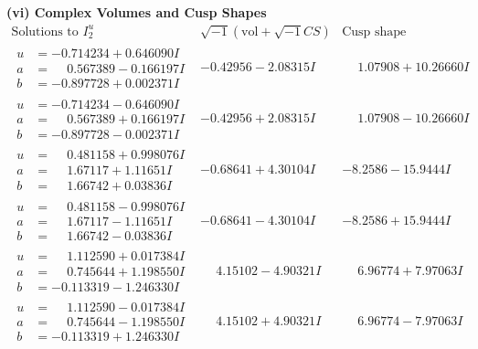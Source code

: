 \documentclass[1p]{elsarticle_modified}
\theoremstyle{definition}
\newcommand{\I}{\sqrt{-1}}
\begin{document}
\newpage\flushleft \textbf{(vi) Complex Volumes and Cusp Shapes}
$$\begin{array}{c|c|c}  
\text{Solutions to }I^u_{2}& \I (\text{vol} + \sqrt{-1}CS) & \text{Cusp shape}\\
 \hline 
\begin{aligned}
u &= -0.714234 + 0.646090 I \\
a &= \phantom{-}0.567389 - 0.166197 I \\
b &= -0.897728 + 0.002371 I\end{aligned}
 & -0.42956 - 2.08315 I & \phantom{-}1.07908 + 10.26660 I \\ \hline\begin{aligned}
u &= -0.714234 - 0.646090 I \\
a &= \phantom{-}0.567389 + 0.166197 I \\
b &= -0.897728 - 0.002371 I\end{aligned}
 & -0.42956 + 2.08315 I & \phantom{-}1.07908 - 10.26660 I \\ \hline\begin{aligned}
u &= \phantom{-}0.481158 + 0.998076 I \\
a &= \phantom{-}1.67117 + 1.11651 I \\
b &= \phantom{-}1.66742 + 0.03836 I\end{aligned}
 & -0.68641 + 4.30104 I & -8.2586 - 15.9444 I \\ \hline\begin{aligned}
u &= \phantom{-}0.481158 - 0.998076 I \\
a &= \phantom{-}1.67117 - 1.11651 I \\
b &= \phantom{-}1.66742 - 0.03836 I\end{aligned}
 & -0.68641 - 4.30104 I & -8.2586 + 15.9444 I \\ \hline\begin{aligned}
u &= \phantom{-}1.112590 + 0.017384 I \\
a &= \phantom{-}0.745644 + 1.198550 I \\
b &= -0.113319 - 1.246330 I\end{aligned}
 & \phantom{-}4.15102 - 4.90321 I & \phantom{-}6.96774 + 7.97063 I \\ \hline\begin{aligned}
u &= \phantom{-}1.112590 - 0.017384 I \\
a &= \phantom{-}0.745644 - 1.198550 I \\
b &= -0.113319 + 1.246330 I\end{aligned}
 & \phantom{-}4.15102 + 4.90321 I & \phantom{-}6.96774 - 7.97063 I \\ \hline\begin{aligned}

\end{aligned}
\end{array}$$
\end{document}
